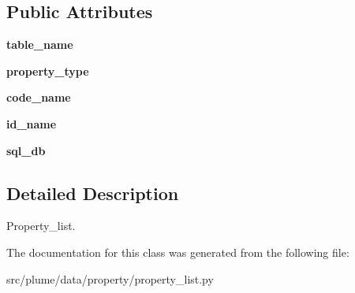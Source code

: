 \subsection*{Public Attributes}
\begin{DoxyCompactItemize}
\item 
{\bfseries table\+\_\+name}\hypertarget{classplume-creator_1_1src_1_1plume_1_1data_1_1property_1_1property__list_1_1_property_list_a35a0d9c1dfa49a166996b9db0392a20f}{}\label{classplume-creator_1_1src_1_1plume_1_1data_1_1property_1_1property__list_1_1_property_list_a35a0d9c1dfa49a166996b9db0392a20f}

\item 
{\bfseries property\+\_\+type}\hypertarget{classplume-creator_1_1src_1_1plume_1_1data_1_1property_1_1property__list_1_1_property_list_a2cc1afb23f1e26d05b12d36e0c5f7271}{}\label{classplume-creator_1_1src_1_1plume_1_1data_1_1property_1_1property__list_1_1_property_list_a2cc1afb23f1e26d05b12d36e0c5f7271}

\item 
{\bfseries code\+\_\+name}\hypertarget{classplume-creator_1_1src_1_1plume_1_1data_1_1property_1_1property__list_1_1_property_list_afeff8ba9ad8f6f23fa82403e085fd38a}{}\label{classplume-creator_1_1src_1_1plume_1_1data_1_1property_1_1property__list_1_1_property_list_afeff8ba9ad8f6f23fa82403e085fd38a}

\item 
{\bfseries id\+\_\+name}\hypertarget{classplume-creator_1_1src_1_1plume_1_1data_1_1property_1_1property__list_1_1_property_list_a7dfd9b1b124a042cd0858e79fcebd526}{}\label{classplume-creator_1_1src_1_1plume_1_1data_1_1property_1_1property__list_1_1_property_list_a7dfd9b1b124a042cd0858e79fcebd526}

\item 
{\bfseries sql\+\_\+db}\hypertarget{classplume-creator_1_1src_1_1plume_1_1data_1_1property_1_1property__list_1_1_property_list_ad5b512f6f03e0ecacd719025590de56c}{}\label{classplume-creator_1_1src_1_1plume_1_1data_1_1property_1_1property__list_1_1_property_list_ad5b512f6f03e0ecacd719025590de56c}

\end{DoxyCompactItemize}


\subsection{Detailed Description}
Property\+\_\+list. 

The documentation for this class was generated from the following file\+:\begin{DoxyCompactItemize}
\item 
src/plume/data/property/property\+\_\+list.\+py\end{DoxyCompactItemize}
